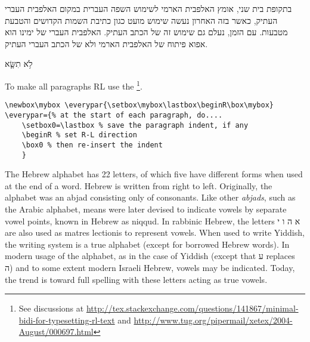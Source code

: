 בתקופת בית שני, אומץ האלפבית הארמי לשימוש השפה העברית במקום האלפבית העברי העתיק, כאשר בזה האחרון נעשה שימוש מועט כגון כתיבת השמות הקדושים והטבעת מטבעות. עם הזמן, נעלם גם שימוש זה של הכתב העתיק. האלפבית העברי של ימינו הוא אפוא פיתוח של האלפבית הארמי ולא של הכתב העברי העתיק.	
{}

\HHUGE לֹ֥א תִשָּׂ֛א

\endR


\egroup
\bottomline
\medskip

To make all paragraphs  RL use the \cmd{\everypar}\footnote{See discussions at \url{http://tex.stackexchange.com/questions/141867/minimal-bidi-for-typesetting-rl-text} and \url{http://www.tug.org/pipermail/xetex/2004-August/000697.html}}. 

\begin{verbatim}
\newbox\mybox \everypar{\setbox\mybox\lastbox\beginR\box\mybox}
\everypar={% at the start of each paragraph, do....
    \setbox0=\lastbox % save the paragraph indent, if any
    \beginR % set R-L direction
    \box0 % then re-insert the indent
	}
\end{verbatim}

The Hebrew alphabet has 22 letters, of which five have different forms when used at the end of a word. Hebrew is written from right to left. Originally, the alphabet was an abjad consisting only of consonants. Like other \textit{abjads}, such as the Arabic alphabet, means were later devised to indicate vowels by separate vowel points, known in Hebrew as niqqud. In rabbinic Hebrew, the letters א ה ו י are also used as matres lectionis to represent vowels. When used to write Yiddish, the writing system is a true alphabet (except for borrowed Hebrew words). In modern usage of the alphabet, as in the case of Yiddish (except that ע replaces ה) and to some extent modern Israeli Hebrew, vowels may be indicated. Today, the trend is toward full spelling with these letters acting as true vowels.
